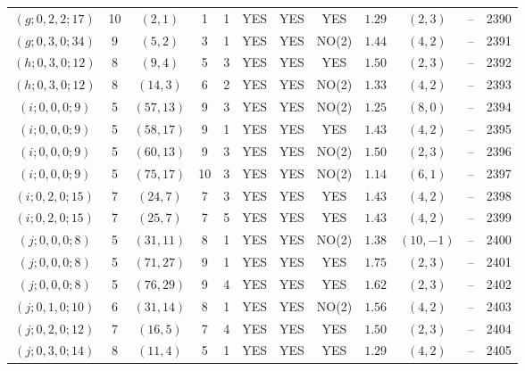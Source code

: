 \begin{longtable}{|c|c|c|c|c|c|c|c|c|c|c|c|}
$(g;0,2,2;17)$ & 10 & $(2,1)$ & 1 & 1 & YES & YES & YES & $1.29$ & $(2,3)$ & -- & 2390\\
$(g;0,3,0;34)$ & 9 & $(5,2)$ & 3 & 1 & YES & YES & NO(2) & $1.44$ & $(4,2)$ & -- & 2391\\
$(h;0,3,0;12)$ & 8 & $(9,4)$ & 5 & 3 & YES & YES & YES & $1.50$ & $(2,3)$ & -- & 2392\\
$(h;0,3,0;12)$ & 8 & $(14,3)$ & 6 & 2 & YES & YES & NO(2) & $1.33$ & $(4,2)$ & -- & 2393\\
$(i;0,0,0;9)$ & 5 & $(57,13)$ & 9 & 3 & YES & YES & NO(2) & $1.25$ & $(8,0)$ & -- & 2394\\
$(i;0,0,0;9)$ & 5 & $(58,17)$ & 9 & 1 & YES & YES & YES & $1.43$ & $(4,2)$ & -- & 2395\\
$(i;0,0,0;9)$ & 5 & $(60,13)$ & 9 & 3 & YES & YES & NO(2) & $1.50$ & $(2,3)$ & -- & 2396\\
$(i;0,0,0;9)$ & 5 & $(75,17)$ & 10 & 3 & YES & YES & NO(2) & $1.14$ & $(6,1)$ & -- & 2397\\
$(i;0,2,0;15)$ & 7 & $(24,7)$ & 7 & 3 & YES & YES & YES & $1.43$ & $(4,2)$ & -- & 2398\\
$(i;0,2,0;15)$ & 7 & $(25,7)$ & 7 & 5 & YES & YES & YES & $1.43$ & $(4,2)$ & -- & 2399\\
$(j;0,0,0;8)$ & 5 & $(31,11)$ & 8 & 1 & YES & YES & NO(2) & $1.38$ & $(10,-1)$ & -- & 2400\\
$(j;0,0,0;8)$ & 5 & $(71,27)$ & 9 & 1 & YES & YES & YES & $1.75$ & $(2,3)$ & -- & 2401\\
$(j;0,0,0;8)$ & 5 & $(76,29)$ & 9 & 4 & YES & YES & YES & $1.62$ & $(2,3)$ & -- & 2402\\
$(j;0,1,0;10)$ & 6 & $(31,14)$ & 8 & 1 & YES & YES & NO(2) & $1.56$ & $(4,2)$ & -- & 2403\\
$(j;0,2,0;12)$ & 7 & $(16,5)$ & 7 & 4 & YES & YES & YES & $1.50$ & $(2,3)$ & -- & 2404\\
$(j;0,3,0;14)$ & 8 & $(11,4)$ & 5 & 1 & YES & YES & YES & $1.29$ & $(4,2)$ & -- & 2405
\end{longtable}
